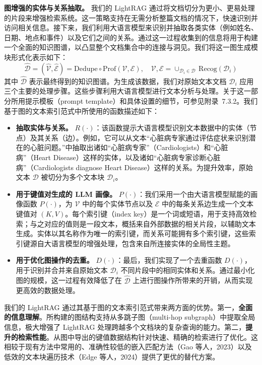 \documentclass[11pt,UTF8,fontset=fandol]{ctexart}
\begin{document}
\textbf{图增强的实体与关系抽取。} 我们的 LightRAG 通过将文档切分为更小、更易处理的片段来增强检索系统。这一策略支持在无需分析整篇文档的情况下，快速识别并访问相关信息。接下来，我们利用大语言模型来识别并抽取各类实体（例如姓名、日期、地点和事件）以及它们之间的关系。通过这一过程收集到的信息将用于构建一个全面的知识图谱，以凸显整个文档集合中的连接与洞见。我们将这一图生成模块形式化表示如下：
\begin{equation}
\hat{\mathcal{D}} = (\hat{\mathcal{V}}, \hat{\mathcal{E}}) = \mathrm{Dedupe} \circ \mathrm{Prof}(\mathcal{V}, \mathcal{E}),\quad
\mathcal{V}, \mathcal{E} = \cup_{\mathcal{D}_i \in \mathcal{D}}\, \mathrm{Recog}(\mathcal{D}_i)
\end{equation}
其中 $\hat{\mathcal{D}}$ 表示最终得到的知识图谱。为生成该数据，我们对原始文本文档 $\mathcal{D}_i$ 应用三个主要的处理步骤。这些步骤利用大语言模型进行文本分析与处理。关于这一部分所用提示模板（prompt template）和具体设置的细节，可参见附录~7.3.2。我们基于图的文本索引范式中所使用的函数描述如下：

\begin{itemize}[leftmargin=1.5em]
\item \textbf{抽取实体与关系。} $R(\cdot)$：该函数提示大语言模型识别文本数据中的实体（节点）及其关系（边）。例如，它可以从文本“心脏病专家通过评估症状来识别潜在的心脏问题。”中抽取出诸如“心脏病专家”（Cardiologists）和“心脏病”（Heart Disease）这样的实体，以及诸如“心脏病专家诊断心脏病”（Cardiologists diagnose Heart Disease）这样的关系。为提升效率，原始文本 $\mathcal{D}$ 被切分为多个文本块 $\mathcal{D}_i$。
\item \textbf{用于键值对生成的 LLM 画像。} $P(\cdot)$：我们采用一个由大语言模型赋能的画像函数 $P(\cdot)$，为 $\mathcal{V}$ 中的每个实体节点以及 $\mathcal{E}$ 中的每条关系边生成一个文本键值对 $(K, V)$。每个索引键（index key）是一个词或短语，用于支持高效检索；与之对应的值则是一段文本，概括来自外部数据的相关片段，以辅助文本生成。实体以其名称作为唯一的索引键，而关系可能拥有多个索引键，这些索引键源自大语言模型的增强处理，包含来自所连接实体的全局性主题。
\item \textbf{用于优化图操作的去重。} $D(\cdot)$：最后，我们实现了一个去重函数 $D(\cdot)$，用于识别并合并来自原始文本 $\mathcal{D}_i$ 不同片段中的相同实体和关系。通过最小化图的规模，这一过程有效降低了在 $\hat{\mathcal{D}}$ 上进行图操作所带来的开销，从而实现更高效的数据处理。
\end{itemize}

我们的 LightRAG 通过其基于图的文本索引范式带来两方面的优势。第一，\textbf{全面的信息理解}。所构建的图结构支持从多跳子图（multi-hop subgraph）中提取全局信息，极大增强了 LightRAG 处理跨越多个文档块的复杂查询的能力。第二，\textbf{提升的检索性能}。从图中导出的键值数据结构针对快速、精确的检索进行了优化。这相较于现有方法中常用的、准确性较低的嵌入匹配方法（Gao 等人，2023）以及低效的文本块遍历技术（Edge 等人，2024）提供了更优的替代方案。
\end{document}
